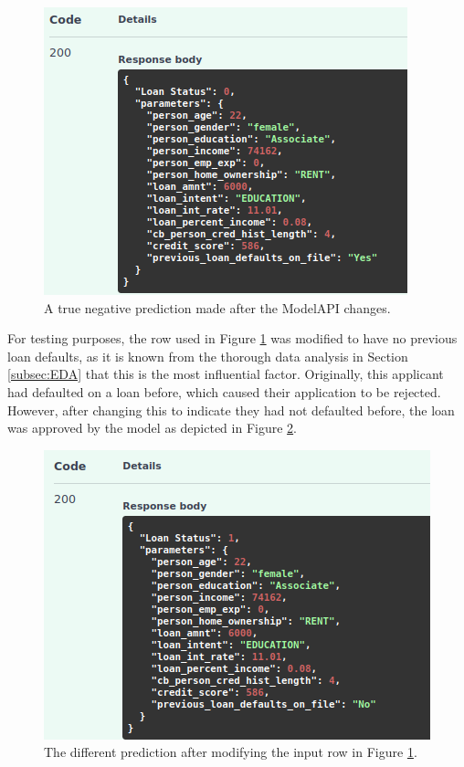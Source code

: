 \documentclass[12pt]{report}
\begin{document}
\begin{figure}[H]
    \centering
    \includegraphics[width=.75\linewidth]{Implementation/JAN 10 UPDATES/NewTrueNegativeOutput.png}
    \caption{A true negative prediction made after the ModelAPI changes.}
    \label{fig:TrueNegativeNew}
\end{figure}

\noindent For testing purposes, the row used in Figure \ref{fig:TrueNegativeNew} was modified to have no previous loan 
defaults, as it is known from the thorough data analysis in Section \ref{subsec:EDA} that this is the most influential 
factor. Originally, this applicant had defaulted on a loan before, which caused their application to be rejected. However,
after changing this to indicate they had not defaulted before, the loan was approved by the model as depicted in Figure 
\ref{fig:UviCustomRow}.

\begin{figure}[H]
    \centering
    \includegraphics[width=.75\linewidth]{Implementation/JAN 10 UPDATES/UviCustomRow.png}
    \caption{The different prediction after modifying the input row in Figure \ref{fig:TrueNegativeNew}.}
    \label{fig:UviCustomRow}
\end{figure}
\end{document}
